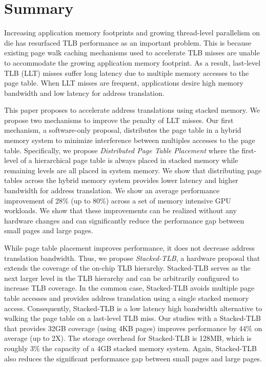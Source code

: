 \section{Summary}

\noindent Increasing application memory footprints and growing
thread-level parallelism on die has resurfaced TLB performance as an
important problem. This is because existing page walk caching
mechanisms used to accelerate TLB misses are unable to accommodate the
growing application memory footprint. As a result, last-level TLB
(LLT) misses suffer long latency due to multiple memory accesses to
the page table. When LLT misses are frequent, applications desire high
memory bandwidth and low latency for address translation.

This paper proposes to accelerate address translations using stacked
memory. We propose two mechanisms to improve the penalty of LLT
misses. Our first mechanism, a software-only proposal, distributes the
page table in a hybrid memory system to minimize interference between
multiples accesses to the page table. Specifically, we propose {\em
Distributed Page Table Placement} where the first-level of a
hierarchical page table is always placed in stacked memory while
remaining levels are all placed in system memory. We show that
distributing page tables across the hybrid memory system provides
lower latency and higher bandwidth for address translation. We show an
average performance improvement of 28\% (up to 80\%) across a set of
memory intensive GPU workloads. We show that these improvements can be
realized without any hardware changes and can significantly reduce the
performance gap between small pages and large pages.


While page table placement improves performance, it does not decrease
address translation bandwidth. Thus, we propose {\em Stacked-TLB}, a
hardware proposal that extends the coverage of the on-chip TLB
hierarchy. Stacked-TLB serves as the next larger level in the TLB
hierarchy and can be arbitrarily configured to increase TLB coverage.
In the common case, Stacked-TLB avoids multiple page table accesses
and provides address translation using a single stacked memory access.
Consequently, Stacked-TLB is a low latency high bandwidth alternative
to walking the page table on a last-level TLB miss. Our studies with a
Stacked-TLB that provides 32GB coverage (using 4KB pages) improves
performance by 44\% on average (up to 2X). The storage overhead for
Stacked-TLB is 128MB, which is roughly 3\% the capacity of a 4GB
stacked memory system. Again, Stacked-TLB also reduces the significant
performance gap between small pages and large pages.

% 
